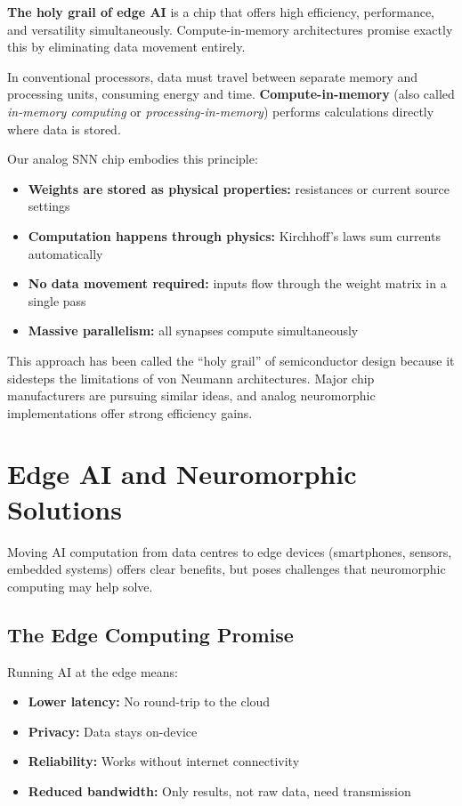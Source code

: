 \documentclass[11pt,a4paper]{article}
\begin{document}
\begin{tcolorbox}[keypoint]
\textbf{The holy grail of edge AI} is a chip that offers high efficiency, performance, and versatility simultaneously. Compute-in-memory architectures promise exactly this by eliminating data movement entirely.
\end{tcolorbox}

In conventional processors, data must travel between separate memory and processing units, consuming energy and time. \textbf{Compute-in-memory} (also called \textit{in-memory computing} or \textit{processing-in-memory}) performs calculations directly where data is stored.

Our analog SNN chip embodies this principle:
\begin{itemize}
    \item \textbf{Weights are stored as physical properties:} resistances or current source settings
    \item \textbf{Computation happens through physics:} Kirchhoff's laws sum currents automatically
    \item \textbf{No data movement required:} inputs flow through the weight matrix in a single pass
    \item \textbf{Massive parallelism:} all synapses compute simultaneously
\end{itemize}

This approach has been called the ``holy grail'' of semiconductor design because it sidesteps the limitations of von Neumann architectures. Major chip manufacturers are pursuing similar ideas, and analog neuromorphic implementations offer strong efficiency gains.

\section{Edge AI and Neuromorphic Solutions}

Moving AI computation from data centres to edge devices (smartphones, sensors, embedded systems) offers clear benefits, but poses challenges that neuromorphic computing may help solve.

\subsection{The Edge Computing Promise}

Running AI at the edge means:
\begin{itemize}
    \item \textbf{Lower latency:} No round-trip to the cloud
    \item \textbf{Privacy:} Data stays on-device
    \item \textbf{Reliability:} Works without internet connectivity
    \item \textbf{Reduced bandwidth:} Only results, not raw data, need transmission
\end{itemize}
\end{document}
